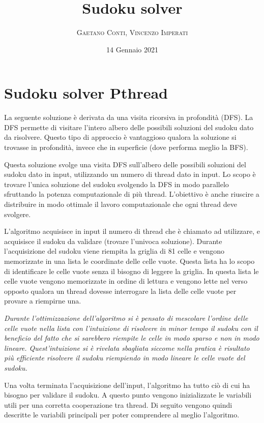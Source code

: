 \documentclass[twoside,twocolumn]{article}
\title{Sudoku solver}
\author{
\textsc{Gaetano Conti, Vincenzo Imperati}\\[1ex]
}
\date{14 Gennaio 2021}
\begin{document}
\maketitle
\section{Sudoku solver Pthread}
La seguente soluzione è derivata da una visita ricorsiva in profondità (DFS). La DFS permette di visitare l'intero albero delle possibili soluzioni del sudoku dato da risolvere. Questo tipo di approccio è vantaggioso qualora la soluzione si trovasse in profondità, invece che in superficie (dove performa meglio la BFS).

Questa soluzione svolge una visita DFS sull'albero delle possibili soluzioni del sudoku dato in input, utilizzando un numero di thread dato in input. Lo scopo è trovare l'unica soluzione del sudoku svolgendo la DFS in modo parallelo sfruttando la potenza computazionale di più thread. L'obiettivo è anche riuscire a distribuire in modo ottimale il lavoro computazionale che ogni thread deve svolgere.

L'algoritmo acquisisce in input il numero di thread che è chiamato ad utilizzare, e acquisisce il sudoku da validare (trovare l'univoca soluzione). Durante l'acquisizione del sudoku viene riempita la griglia di 81 celle e vengono memorizzate in una lista le coordinate delle celle vuote. Questa lista ha lo scopo di identificare le celle vuote senza il bisogno di leggere la griglia. In questa lista le celle vuote vengono memorizzate in ordine di lettura e vengono lette nel verso opposto qualora un thread dovesse interrogare la lista delle celle vuote per provare a riempirne una.

{\itshape Durante l'ottimizzazione dell'algoritmo si è pensato di mescolare l'ordine delle celle vuote nella lista con l'intuizione di risolvere in minor tempo il sudoku con il beneficio del fatto che si sarebbero riempite le celle in modo sparso e non in modo lineare. Quest'intuizione si è rivelata sbagliata siccome nella pratica è risultato più efficiente risolvere il sudoku riempiendo in modo lineare le celle vuote del sudoku.}

Una volta terminata l'acquisizione dell'input, l'algoritmo ha tutto ciò di cui ha bisogno per validare il sudoku. A questo punto vengono inizializzate le variabili utili per una corretta cooperazione tra thread. Di seguito vengono quindi descritte le variabili principali per poter comprendere al meglio l'algoritmo.
\end{document}
